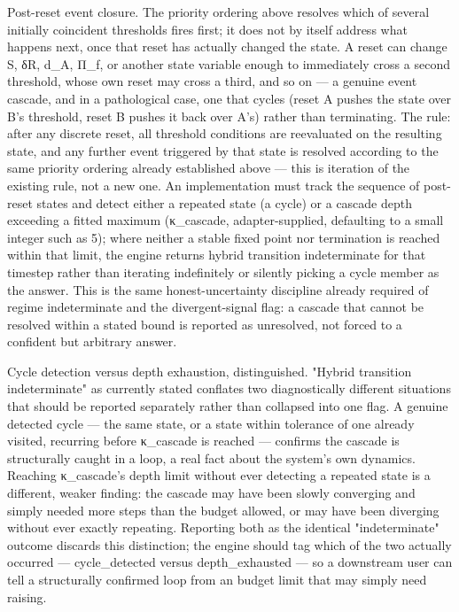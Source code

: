 \documentclass[
]{article}
\begin{document}
Post-reset event closure. The priority ordering above resolves which of
several initially coincident thresholds fires first; it does not by
itself address what happens next, once that reset has actually changed
the state. A reset can change S, δR, d\_A, Π\_f, or another state
variable enough to immediately cross a second threshold, whose own reset
may cross a third, and so on --- a genuine event cascade, and in a
pathological case, one that cycles (reset A pushes the state over B's
threshold, reset B pushes it back over A's) rather than terminating. The
rule: after any discrete reset, all threshold conditions are reevaluated
on the resulting state, and any further event triggered by that state is
resolved according to the same priority ordering already established
above --- this is iteration of the existing rule, not a new one. An
implementation must track the sequence of post-reset states and detect
either a repeated state (a cycle) or a cascade depth exceeding a fitted
maximum (κ\_cascade, adapter-supplied, defaulting to a small integer
such as 5); where neither a stable fixed point nor termination is
reached within that limit, the engine returns hybrid transition
indeterminate for that timestep rather than iterating indefinitely or
silently picking a cycle member as the answer. This is the same
honest-uncertainty discipline already required of regime indeterminate
and the divergent-signal flag: a cascade that cannot be resolved within
a stated bound is reported as unresolved, not forced to a confident but
arbitrary answer.

Cycle detection versus depth exhaustion, distinguished. "Hybrid
transition indeterminate" as currently stated conflates two
diagnostically different situations that should be reported separately
rather than collapsed into one flag. A genuine detected cycle --- the
same state, or a state within tolerance of one already visited,
recurring before κ\_cascade is reached --- confirms the cascade is
structurally caught in a loop, a real fact about the system's own
dynamics. Reaching κ\_cascade's depth limit without ever detecting a
repeated state is a different, weaker finding: the cascade may have been
slowly converging and simply needed more steps than the budget allowed,
or may have been diverging without ever exactly repeating. Reporting
both as the identical "indeterminate" outcome discards this distinction;
the engine should tag which of the two actually occurred ---
cycle\_detected versus depth\_exhausted --- so a downstream user can
tell a structurally confirmed loop from an budget limit that may simply
need raising.
\end{document}
